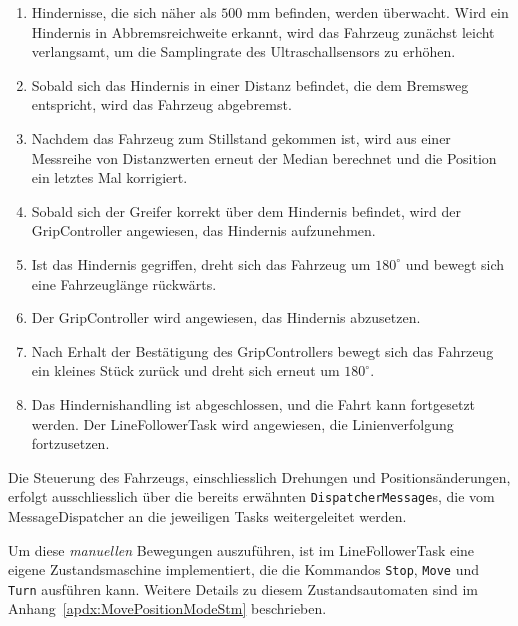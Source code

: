 \documentclass[main.tex]{subfiles} %
\begin{document}
\begin{enumerate}
    \item Hindernisse, die sich näher als $500$ mm befinden, werden überwacht. Wird ein
          Hindernis in Abbremsreichweite erkannt, wird das Fahrzeug zunächst leicht
          verlangsamt, um die Samplingrate des Ultraschallsensors zu erhöhen.

    \item Sobald sich das Hindernis in einer Distanz befindet, die dem Bremsweg
          entspricht, wird das Fahrzeug abgebremst.

    \item Nachdem das Fahrzeug zum Stillstand gekommen ist, wird aus einer Messreihe von
          Distanzwerten erneut der Median berechnet und die Position ein letztes Mal
          korrigiert.

    \item Sobald sich der Greifer korrekt über dem Hindernis befindet, wird der
          GripController angewiesen, das Hindernis aufzunehmen.

    \item Ist das Hindernis gegriffen, dreht sich das Fahrzeug um $180^\circ$ und bewegt
          sich eine Fahrzeuglänge rückwärts.

    \item Der GripController wird angewiesen, das Hindernis abzusetzen.

    \item Nach Erhalt der Bestätigung des GripControllers bewegt sich das Fahrzeug ein
          kleines Stück zurück und dreht sich erneut um $180^\circ$.

    \item Das Hindernishandling ist abgeschlossen, und die Fahrt kann fortgesetzt werden.
          Der LineFollowerTask wird angewiesen, die Linienverfolgung fortzusetzen.
\end{enumerate}

Die Steuerung des Fahrzeugs, einschliesslich Drehungen und Positionsänderungen,
erfolgt ausschliesslich über die bereits erwähnten \texttt{DispatcherMessage}s,
die vom MessageDispatcher an die jeweiligen Tasks weitergeleitet werden.

Um diese \textit{manuellen} Bewegungen auszuführen, ist im LineFollowerTask
eine eigene Zustandsmaschine implementiert, die die Kommandos \texttt{Stop},
\texttt{Move} und \texttt{Turn} ausführen kann. Weitere Details zu diesem
Zustandsautomaten sind im Anhang~\ref{apdx:MovePositionModeStm} beschrieben.
\end{document}
